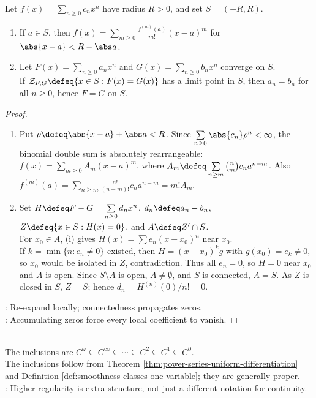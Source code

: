 \begin{theorem} \label{thm:power-series-reexpansion-and-identity} \\
Let $f(x)=\sum_{n\ge0}c_nx^n$ have radius $R>0$, and set $S=(-R,R)$.
\begin{enumerate}[label=(\roman*)]
\setlength{\itemsep}{0pt}
\item If $a\in S$, then $f(x)=\sum\limits_{m\geq0}\frac{f^{(m)}(a)}{m!}(x-a)^m$ for $\abs{x-a}<R-\abs a$.
\item Let $F(x)=\sum\limits_{n\geq0}a_nx^n$ and $G(x)=\sum\limits_{n\geq0}b_nx^n$ converge on $S$.\\
If $\mathcal{Z}_{F,G}\defeq\{x\in S:F(x)=G(x)\}$ has a limit point in $S$, then $a_n=b_n$ for all $n\ge0$, hence $F=G$ on $S$.
\end{enumerate}
\begin{proof}
\begin{enumerate}[label=(\roman*)]
\setlength{\itemsep}{0pt}
\item Put $\rho\defeq\abs{x-a}+\abs a<R$. Since $\sum\limits_{n\geq0}\abs{c_n}\rho^n<\infty$, the binomial double sum is absolutely rearrangeable:\\
$f(x)=\sum\limits_{m\geq0}A_m(x-a)^m$, where $A_m\defeq\sum\limits_{n\geq m}\binom{n}{m}c_na^{n-m}$. Also $f^{(m)}(a)=\sum\limits_{n\geq m}\frac{n!}{(n-m)!}c_na^{n-m}=m!A_m$.
\item Set $H\defeq F-G=\sum\limits_{n\geq0}d_nx^n$, $d_n\defeq a_n-b_n$, $Z\defeq\{x\in S:H(x)=0\}$, and $A\defeq Z'\cap S$.\\
For $x_0\in A$, (i) gives $H(x)=\sum e_n(x-x_0)^n$ near $x_0$.\\
If $k=\min\{n:e_n\neq0\}$ existed, then $H=(x-x_0)^kg$ with $g(x_0)=e_k\neq0$, so $x_0$ would be isolated in $Z$, contradiction. Thus all $e_n=0$, so $H=0$ near $x_0$ and $A$ is open. Since $S\setminus A$ is open, $A\neq\emptyset$, and $S$ is connected, $A=S$. As $Z$ is closed in $S$, $Z=S$; hence $d_n=H^{(n)}(0)/n!=0$.
\end{enumerate}
: Re-expand locally; connectedness propagates zeros.\\
: Accumulating zeros force every local coefficient to vanish.
\end{proof}
\end{theorem}

\begin{perspective} \label{per:regularity-hierarchy-one-variable} \\
The inclusions are $C^\omega\subseteq C^\infty\subseteq \cdots \subseteq C^2\subseteq C^1\subseteq C^0$.\\
The inclusions follow from Theorem \ref{thm:power-series-uniform-differentiation} and Definition \ref{def:smoothness-classes-one-variable}; they are generally proper.\\
: Higher regularity is extra structure, not just a different notation for continuity.
\end{perspective}

